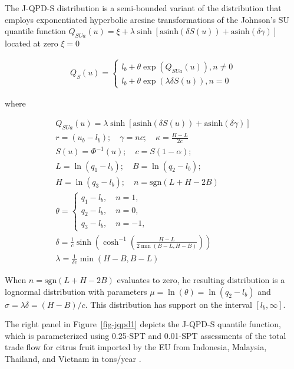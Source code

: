 \documentclass[
  fleqn,
  deca,
  blindrev
]{informs4}
\begin{document}
The J-QPD-S distribution is a semi-bounded variant of the distribution
that employs exponentiated hyperbolic arcsine transformations of the
Johnson's SU quantile function
\(Q_{SUa}(u) = \xi + \lambda\sinh\left[\text{asinh}(\delta S(u)) + \text{asinh}(\delta\gamma)\right]\)
located at zero \(\xi=0\)
\citep{hadlock2017JohnsonQuantileParameterizedDistributions}

\[
\begin{gathered}
Q_S(u)=\begin{cases}
l_b+\theta\exp\left(Q_{SUa}(u)\right),n \neq 0\\
l_b+\theta\exp\left(\lambda\delta S(u)\right),n=0
\end{cases}
\end{gathered}
\]

where

\[
\begin{gathered}
Q_{SUa}(u) = \lambda\sinh\left[\text{asinh}(\delta S(u)) + \text{asinh}(\delta\gamma)\right]\\
r=(u_b-l_b); \quad \gamma=nc; \quad \kappa=\frac{H-L}{2c}\\
S(u)=\Phi^{-1}(u); \quad c=S(1-\alpha);\\
L=\ln(q_1-l_b); \quad  B=\ln(q_2-l_b);\\
H=\ln(q_3-l_b); \quad n=\text{sgn}(L+H-2B)\\
\theta=\begin{cases}
q_1-l_b, \quad n=1,\\
q_2-l_b, \quad n=0,\\
q_3-l_b, \quad n=-1,\end{cases}\\
\delta=\frac{1}{c}\sinh\left(\cosh^{-1}\left(\frac{H-L}{2\min(B-L,H-B)}\right)\right)\\
\lambda=\frac{1}{\delta c}\min(H-B, B-L)
\end{gathered}
\]

When \(n=\text{sgn}(L+H-2B)\) evaluates to zero, he resulting
distribution is a lognormal distribution with parameters
\(\mu=\ln(\theta)=\ln(q_2-l_b)\) and \(\sigma=\lambda\delta=(H-B)/c\).
This distribution has support on the interval \([l_b,\infty]\).

The right panel in Figure~\ref{fig-jqpd1} depicts the J-QPD-S quantile
function, which is parameterized using 0.25-SPT and 0.01-SPT assessments
of the total trade flow for citrus fruit imported by the EU from
Indonesia, Malaysia, Thailand, and Vietnam in tons/year
\citep{efsa2023RiskAssessmentCitripestis}.
\end{document}
